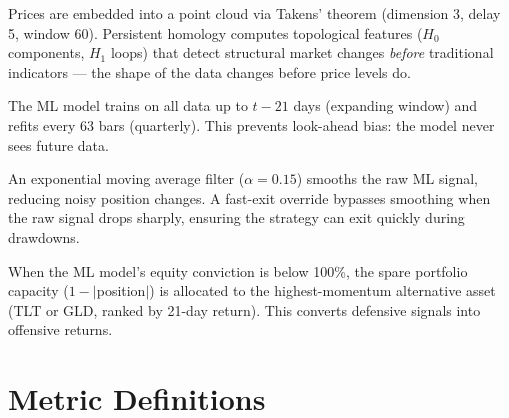 \documentclass[11pt]{article}
\begin{document}
\begin{description}[style=nextline, leftmargin=4cm, font=\bfseries]
    \item[TDA / Persistent Homology] Prices are embedded into a point cloud via Takens' theorem (dimension 3, delay 5, window 60). Persistent homology computes topological features ($H_0$ components, $H_1$ loops) that detect structural market changes \emph{before} traditional indicators --- the shape of the data changes before price levels do.
    \item[Walk-Forward Training] The ML model trains on all data up to $t - 21$ days (expanding window) and refits every 63 bars (quarterly). This prevents look-ahead bias: the model never sees future data.
    \item[Signal Smoothing] An exponential moving average filter ($\alpha = 0.15$) smooths the raw ML signal, reducing noisy position changes. A fast-exit override bypasses smoothing when the raw signal drops sharply, ensuring the strategy can exit quickly during drawdowns.
    \item[Multi-Asset Rotation] When the ML model's equity conviction is below 100\%, the spare portfolio capacity ($1 - |$position$|$) is allocated to the highest-momentum alternative asset (TLT or GLD, ranked by 21-day return). This converts defensive signals into offensive returns.
\end{description}

\section*{Metric Definitions}
\end{document}
